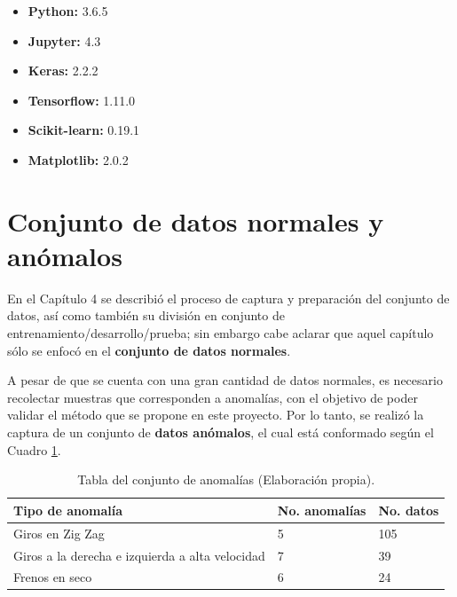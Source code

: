 \begin{itemize}
\item \textbf{Python:} 3.6.5

\item \textbf{Jupyter:} 4.3

\item \textbf{Keras:} 2.2.2

\item \textbf{Tensorflow:} 1.11.0

\item \textbf{Scikit-learn:} 0.19.1

\item \textbf{Matplotlib:} 2.0.2
\end{itemize}

\section{Conjunto de datos normales y an\'{o}malos}

En el Cap\'{i}tulo 4 se describi\'{o} el proceso de captura y preparaci\'{o}n del conjunto de datos, as\'{i} como tambi\'{e}n su divisi\'{o}n en conjunto de entrenamiento/desarrollo/prueba; sin embargo cabe aclarar que aquel cap\'{i}tulo s\'{o}lo se enfoc\'{o} en el \textbf{conjunto de datos normales}.%

\vspace{5mm} %

A pesar de que se cuenta con una gran cantidad de datos normales, es necesario recolectar muestras que corresponden a anomal\'{i}as, con el objetivo de poder validar el m\'{e}todo que se propone en este proyecto. Por lo tanto, se realiz\'{o} la captura de un conjunto de \textbf{datos an\'{o}malos}, el cual est\'{a} conformado seg\'{u}n el Cuadro \ref{table:conjunto_anomalias}.

\begin{table}[H]
\centering
\begin{tabular}{|l|l|l|}
\hline
\textbf{Tipo de anomal\'{i}a} & \textbf{No. anomal\'{i}as} & \textbf{No. datos} \\ \hline
Giros en Zig Zag & 5 & 105  \\ \hline
Giros a la derecha e izquierda a alta velocidad & 7 & 39  \\ \hline
Frenos en seco & 6 & 24 \\ \hline
\end{tabular}
\caption{Tabla del conjunto de anomal\'{i}as (Elaboraci\'{o}n propia).}
\label{table:conjunto_anomalias}
\end{table}

